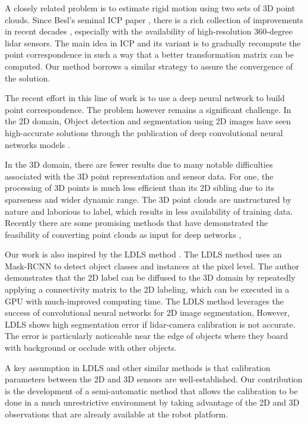 \documentclass[journal]{IEEEtran}
\begin{document}
A closely related problem is to estimate rigid motion using two sets of 3D point clouds. Since Besl's seminal ICP paper \cite{icp}, there is a rich collection of improvements in recent decades \cite{gicp}, especially with the availability of high-resolution 360-degree lidar sensors. The main idea in ICP and its variant is to gradually recompute the point correspondence in such a way that a better transformation matrix can be computed. Our method borrows a similar strategy to assure the convergence of the solution.

The recent effort in this line of work is to use a deep neural network to build point correspondence. The problem however remains a significant challenge. In the 2D domain,
Object detection and segmentation using 2D images
have seen high-accurate solutions through the publication of deep
convolutional neural networks models \cite{ssd,mrcnn}.

In the 3D domain, there are fewer results due to many notable difficulties associated with the 3D point representation and sensor data. For one, the processing of 3D points is much less efficient than its 2D sibling due to its sparseness and wider dynamic range. The 3D point clouds are unstructured by nature
and laborious to label, which results in less availability of training data. Recently there are some promising methods that have demonstrated the feasibility of converting point clouds as input for deep
networks \cite{wu2017squeezeseg},

Our work is also inspired by the LDLS method \cite{wang2019ldls}. The LDLS method uses an Mask-RCNN \cite{mrcnn} to
detect object classes and instances at the pixel level.
The author demonstrates that the 2D label can be diffused to the 3D domain by repeatedly applying a connectivity matrix to the 2D labeling, which can be executed in a GPU with much-improved computing time. The LDLS method
leverages the success of convolutional neural networks for 2D
image segmentation, However, LDLS shows high segmentation error if lidar-camera calibration is not accurate. The error is particularly noticeable near the edge of objects where they board with background or occlude with other objects. 

A key assumption in LDLS and other similar methods is that calibration parameters between the 2D and 3D sensors are well-established. Our contribution is the development of a semi-automatic method that allows the calibration to be done in a much unrestrictive environment by taking advantage of the 2D and 3D observations that are already available at the robot platform.
\end{document}
